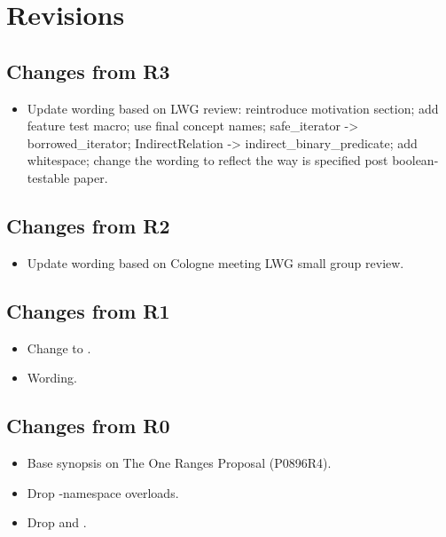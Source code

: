 \section{Revisions}

\subsection{Changes from R3}

\begin{itemize}
  \item Update wording based on LWG review: reintroduce motivation section; add feature test macro; use final concept names; safe_iterator -> borrowed_iterator; IndirectRelation -> indirect_binary_predicate; add whitespace; change the wording to reflect the way  is specified post boolean-testable paper.
\end{itemize}

\subsection{Changes from R2}

\begin{itemize}
  \item Update wording based on Cologne meeting LWG small group review.
\end{itemize}

\subsection{Changes from R1}

\begin{itemize}
  \item Change  to .
  \item Wording.
\end{itemize}

\subsection{Changes from R0}

\begin{itemize}
  \item Base synopsis on The One Ranges Proposal (P0896R4).
  \item Drop -namespace overloads.
  \item Drop  and .
\end{itemize}
